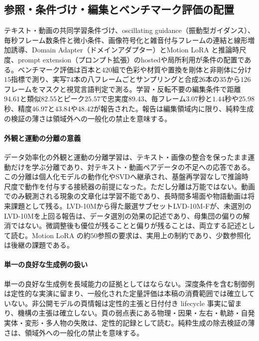 \documentclass[lualatex,a4paper,10pt]{jlreq}
\begin{document}
\subsection{参照・条件づけ・編集とベンチマーク評価の配置}
テキスト・動画の共同学習条件づけ、oscillating guidance（振動型ガイダンス）、毎秒フレーム数条件と微小条件、画像符号化と雑音付与フレームの連結と線形増加誘導、Domain Adapter（ドメインアダプター）とMotion LoRA と推論時尺度、prompt extension（プロンプト拡張）のhostedや局所利用が条件の配置である\autocite{btd070,btd071,btd073,btd075,btd074,btd124}。ベンチマーク評価は百本と$420$組で色彩や材質や置換を剛体と非剛体に分け$15$指標で測り、実写$74$本の八フレームごとサンプリングと合成$26$本の$35$から$126$フレームをマスクと視覚言語判定で測る\autocite{btd138}。学習・反転不要の編集条件で距離$94.61$と類似$82.55$とピーク$25.57$で忠実度$89.43$、毎フレーム$3.07$秒と$1.44$秒や$25.98$秒、精度$46.97$と$43.84$や$48.42$が報告された\autocite{btd138}。報告は編集領域内に限り、純粋生成の検証の薄さは領域外への一般化の禁止を意味する\autocite{btd138}。

\paragraph{外観と運動の分離の意義}
データ効率化の外観と運動の分離学習は、テキスト・画像の整合を保ったまま運動だけを学ぶ分離であり、対テキスト・動画ペアデータの不足への応答である\autocite{btd073}。この分離は個人化モデルの動作化やSVDへ継承され、基盤再学習なしで推論時尺度で動作を付与する接続器の前提になった\autocite{btd073,btd074,btd075}。ただし分離は万能ではない。動画でのみ観測される現象の文章化は学習不能であり、長時間多場面や物語動画は将来課題として残る\autocite{btd073}。LVD-10Mから得た厳選サブセットLVD-10M-Fが、未選別のLVD-10Mを上回る報告は、データ選別の効果の記述であり、母集団の偏りの解消ではない\autocite{btd075}。微調整後も優位が残ることと偏りが残ることは、両立する記述として読む\autocite{btd075}。Motion LoRA の約$50$参照の要求は、実用上の制約であり、少数参照化は後継の課題である\autocite{btd074}。

\paragraph{単一の良好な生成例の扱い}
単一の良好な生成例を長域能力の証拠としてはならない\autocite{btd138}。深度条件を含む制御例は定性的な実演に留まり、一般化された定量評価は本稿の消費範囲では確立していない\autocite{btd074}。非公開モデルの頁情報は定性的主張と日付付き lifecycle 事実に留まり、機構の主張は確立しない\autocite{btd077}。頁の弱点表にある物理・因果・左右・軌跡・自発実体・変形・多人物の失敗は、定性的記録として読む\autocite{btd124}。純粋生成の除去検証の薄さは、領域外への一般化の禁止を意味する\autocite{btd138}。
\end{document}
